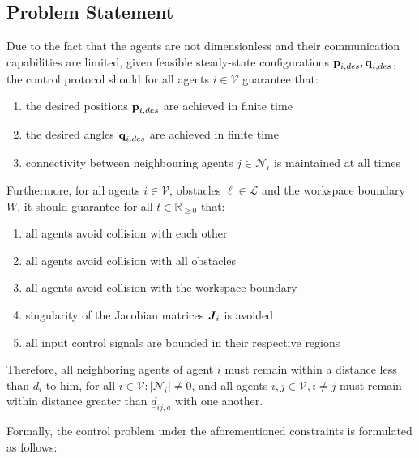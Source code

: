 \subsection{Problem Statement}

Due to the fact that the agents are not dimensionless and their communication
capabilities are limited, given feasible steady-state configurations
$\bm{\mathbf{p}}_{i,des}, \bm{\mathbf{q}}_{i,des}$, the control protocol should for all
agents $i \in \mathcal{V}$ guarantee that:
\begin{enumerate}
  \item the desired positions $\bm{\mathbf{p}}_{i,des}$ are achieved in finite time
  \item the desired angles $\bm{\mathbf{q}}_{i,des}$ are achieved in finite time
  \item connectivity between neighbouring agents $j \in \mathcal{N}_i$ is
    maintained at all times
\end{enumerate}
Furthermore, for all agents $i \in \mathcal{V}$, obstacles $\ell \in \mathcal{L}$
and the workspace boundary $W$, it should guarantee for all
$t\in\mathbb{R}_{\geq 0}$ that:
\begin{enumerate}
  \item all agents avoid collision with each other
  \item all agents avoid collision with all obstacles
  \item all agents avoid collision with the workspace boundary
  \item singularity of the Jacobian matrices $\bm{\mathit{J}}_i$ is avoided
  \item all input control signals are bounded in their respective regions
\end{enumerate}

Therefore, all neighboring agents of agent $i$ must remain within a distance
less than $d_i$ to him, for all $i \in \mathcal{V}: |\mathcal{N}_i| \not= 0$,
and all agents $i, j\in \mathcal{V}, i \neq j$ must remain within distance
greater than $\underline{d}_{ij,a}$ with one another.

Formally, the control problem under the aforementioned constraints is
formulated as follows:\\[2.5ex]

